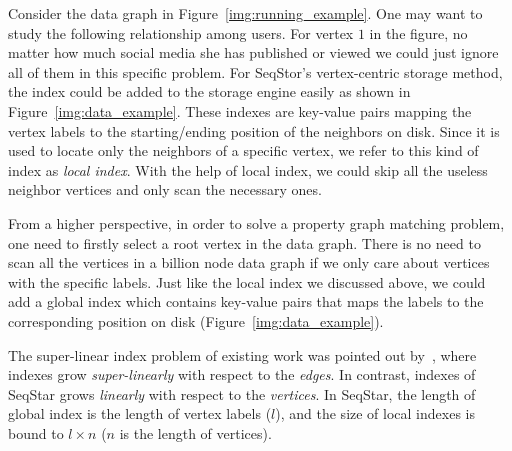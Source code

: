 Consider the data graph in Figure~\ref{img:running_example}.
One may want to study the following relationship among users.
For vertex $1$ in the figure,
no matter how much social media she has published or viewed we could just ignore all of them in this specific problem.
For SeqStor's vertex-centric storage method,
the index could be added to the storage engine easily as shown in Figure~\ref{img:data_example}.
These indexes are key-value pairs mapping the vertex labels to the starting/ending position of the neighbors on disk.
Since it is used to locate only the neighbors of a specific vertex, we refer to this kind of index as \emph{local index}.
With the help of local index, we could skip all the useless neighbor vertices and only scan the necessary ones.

From a higher perspective, in order to solve a property graph matching problem,
one need to firstly select a root vertex in the data graph.
There is no need to scan all the vertices in a billion node data graph if we only care about vertices with the specific labels.
Just like the local index we discussed above, we could add a global index which contains key-value pairs that maps the labels to the corresponding position on disk (Figure~\ref{img:data_example}).

The super-linear index problem of existing work was pointed out by~\cite{DBLP:journals/pvldb/SunWWSL12},
where indexes grow \emph{super-linearly} with respect to the \emph{edges}.
In contrast, indexes of SeqStar grows \emph{linearly} with respect to the \emph{vertices}.
In SeqStar, the length of global index is the length of vertex labels ($l$),
and the size of local indexes is bound to $l \times n$ ($n$ is the length of vertices).
